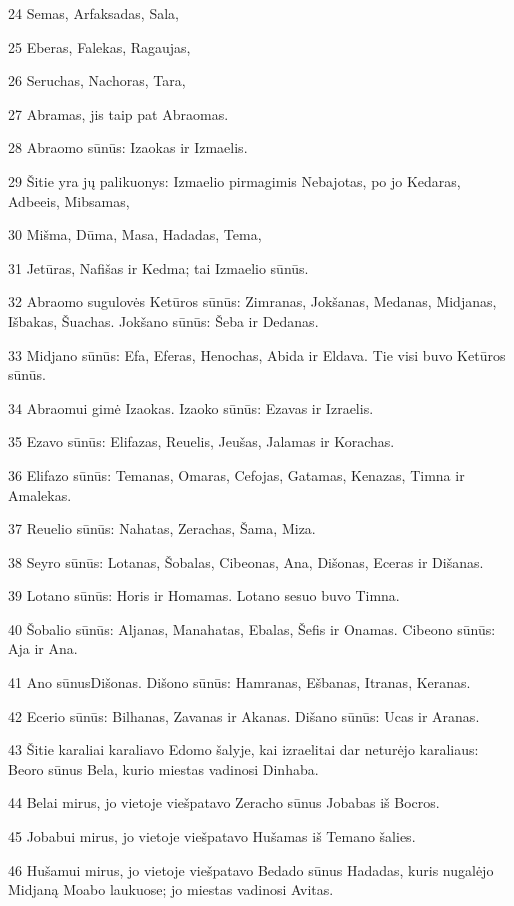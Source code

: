 \par 24 Semas, Arfaksadas, Sala, 
\par 25 Eberas, Falekas, Ragaujas, 
\par 26 Seruchas, Nachoras, Tara, 
\par 27 Abramas, jis taip pat Abraomas. 
\par 28 Abraomo sūnūs: Izaokas ir Izmaelis. 
\par 29 Šitie yra jų palikuonys: Izmaelio pirmagimis Nebajotas, po jo Kedaras, Adbeeis, Mibsamas, 
\par 30 Mišma, Dūma, Masa, Hadadas, Tema, 
\par 31 Jetūras, Nafišas ir Kedma; tai Izmaelio sūnūs. 
\par 32 Abraomo sugulovės Ketūros sūnūs: Zimranas, Jokšanas, Medanas, Midjanas, Išbakas, Šuachas. Jokšano sūnūs: Šeba ir Dedanas. 
\par 33 Midjano sūnūs: Efa, Eferas, Henochas, Abida ir Eldava. Tie visi buvo Ketūros sūnūs. 
\par 34 Abraomui gimė Izaokas. Izaoko sūnūs: Ezavas ir Izraelis. 
\par 35 Ezavo sūnūs: Elifazas, Reuelis, Jeušas, Jalamas ir Korachas. 
\par 36 Elifazo sūnūs: Temanas, Omaras, Cefojas, Gatamas, Kenazas, Timna ir Amalekas. 
\par 37 Reuelio sūnūs: Nahatas, Zerachas, Šama, Miza. 
\par 38 Seyro sūnūs: Lotanas, Šobalas, Cibeonas, Ana, Dišonas, Eceras ir Dišanas. 
\par 39 Lotano sūnūs: Horis ir Homamas. Lotano sesuo buvo Timna. 
\par 40 Šobalio sūnūs: Aljanas, Manahatas, Ebalas, Šefis ir Onamas. Cibeono sūnūs: Aja ir Ana. 
\par 41 Ano sūnus­Dišonas. Dišono sūnūs: Hamranas, Ešbanas, Itranas, Keranas. 
\par 42 Ecerio sūnūs: Bilhanas, Zavanas ir Akanas. Dišano sūnūs: Ucas ir Aranas. 
\par 43 Šitie karaliai karaliavo Edomo šalyje, kai izraelitai dar neturėjo karaliaus: Beoro sūnus Bela, kurio miestas vadinosi Dinhaba. 
\par 44 Belai mirus, jo vietoje viešpatavo Zeracho sūnus Jobabas iš Bocros. 
\par 45 Jobabui mirus, jo vietoje viešpatavo Hušamas iš Temano šalies. 
\par 46 Hušamui mirus, jo vietoje viešpatavo Bedado sūnus Hadadas, kuris nugalėjo Midjaną Moabo laukuose; jo miestas vadinosi Avitas. 
